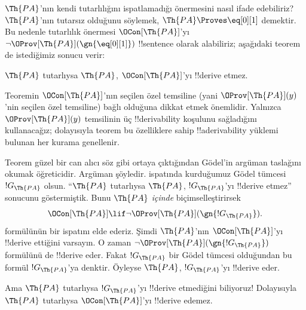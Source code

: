 \documentclass[../../../include/open-logic-section]{subfiles}
\begin{document}


$\Th{PA}$'nın kendi tutarlılığını ispatlamadığı önermesini nasıl ifade
edebiliriz? $\Th{PA}$'nın tutarsız olduğunu söylemek,
$\Th{PA} \Proves \eq[0][1]$ demektir. Bu nedenle tutarlılık önermesi
$\OCon[\Th{PA}]$'yı $\lnot \OProv[\Th{PA}](\gn{\eq[0][1]})$ !!{sentence}
olarak alabiliriz; aşağıdaki teorem de istediğimiz sonucu verir:

\begin{thm}
$\Th{PA}$ tutarlıysa $\Th{PA}$, $\OCon[\Th{PA}]$'yı !!{derive} etmez.
\end{thm}

Teoremin $\OCon[\Th{PA}]$'nın seçilen özel temsiline (yani
$\OProv[\Th{PA}](y)$'nin seçilen özel temsiline) bağlı olduğuna dikkat etmek
önemlidir. Yalnızca $\OProv[\Th{PA}](y)$ temsilinin üç !!{derivability}
koşulunu sağladığını kullanacağız; dolayısıyla teorem bu özelliklere sahip
!!a{derivability} yüklemi bulunan her kurama genellenir.

Teorem güzel bir can alıcı söz gibi ortaya çıktığından G\"odel'in argüman
taslağını okumak öğreticidir. Argüman şöyledir.
 ispatında kurduğumuz G\"odel tümcesi
$!G_\Th{PA}$ olsun. ``$\Th{PA}$ tutarlıysa $\Th{PA}$, $!G_\Th{PA}$'yı
!!{derive} etmez'' sonucunu göstermiştik. Bunu $\Th{PA}$ \emph{içinde}
biçimselleştirirsek
\[
\OCon[\Th{PA}] \lif \lnot \OProv[\Th{PA}](\gn{!G_\Th{PA}}).
\]
formülünün bir ispatını elde ederiz. Şimdi $\Th{PA}$'nın
$\OCon[\Th{PA}]$'yı !!{derive} ettiğini varsayın. O zaman
$\lnot \OProv[\Th{PA}](\gn{!G_\Th{PA}})$ formülünü de !!{derive} eder. Fakat
$!G_\Th{PA}$ bir G\"odel tümcesi olduğundan bu formül $!G_\Th{PA}$'ya
denktir. Öyleyse $\Th{PA}$, $!G_\Th{PA}$'yı !!{derive} eder.

Ama $\Th{PA}$ tutarlıysa $!G_\Th{PA}$'yı !!{derive} etmediğini biliyoruz!{}
Dolayısıyla $\Th{PA}$ tutarlıysa $\OCon[\Th{PA}]$'yı !!{derive} edemez.
\end{document}
